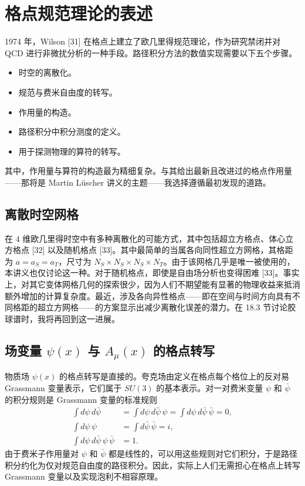 \chapter{格点规范理论的表述}

1974 年，Wilson [31] 在格点上建立了欧几里得规范理论，作为研究禁闭并对 QCD 进行非微扰分析的一种手段。路径积分方法的数值实现需要以下五个步骤。
\begin{itemize}
  \item 时空的离散化。
  \item 规范与费米自由度的转写。
  \item 作用量的构造。
  \item 路径积分中积分测度的定义。
  \item 用于探测物理的算符的转写。
\end{itemize}
其中，作用量与算符的构造最为精细复杂。与其给出最新且改进过的格点作用量——那将是 Martin L\"uscher 讲义的主题——我选择遵循最初发现的道路。

\section{离散时空网格}

在 4 维欧几里得时空中有多种离散化的可能方式，其中包括超立方格点、体心立方格点 [32] 以及随机格点 [33]。其中最简单的当属各向同性超立方网格，其格距为 \(a = a_S = a_T\)，尺寸为 \(N_S \times N_S \times N_S \times N_T\)。由于该网格几乎是唯一被使用的，本讲义也仅讨论这一种。对于随机格点，即使是自由场分析也变得困难 [33]。事实上，对其它变体网格几何的探索很少，因为人们不期望能有显著的物理收益来抵消额外增加的计算复杂度。最近，涉及各向异性格点——即在空间与时间方向具有不同格距的超立方网格——的方案显示出减少离散化误差的潜力。在 18.3 节讨论胶球谱时，我将再回到这一进展。

\section{场变量 \(\psi(x)\) 与 \(A_\mu(x)\) 的格点转写}

物质场 \(\psi(x)\) 的格点转写是直接的。夸克场由定义在格点每个格位上的反对易 Grassmann 变量表示，它们属于 \(SU(3)\) 的基本表示。对一对费米变量 \(\psi\) 和 \(\bar{\psi}\) 的积分规则是 Grassmann 变量的标准规则
\begin{equation}
\begin{aligned}
\int d\psi\,d\bar{\psi} &= \int d\psi\,d\bar{\psi}\,\psi = \int d\psi\,d\bar{\psi}\,\bar{\psi} = 0 , \\
\int d\psi\,\psi &= \int d\bar{\psi}\,\bar{\psi} = i , \\
\int d\psi\,d\bar{\psi}\,\psi\,\bar{\psi} &= 1 .
\end{aligned}
\end{equation}
由于费米子作用量对 \(\psi\) 和 \(\bar{\psi}\) 都是线性的，可以用这些规则对它们积分，于是路径积分约化为仅对规范自由度的路径积分。因此，实际上人们无需担心在格点上转写 Grassmann 变量以及实现泡利不相容原理。

